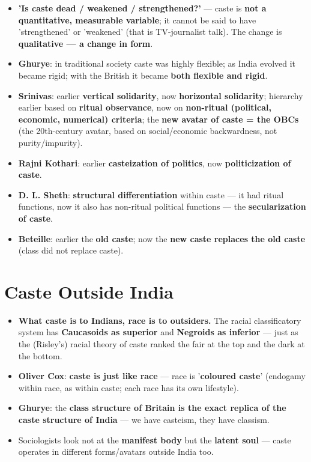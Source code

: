 \begin{KeyConcept}
\begin{itemize}
\item \textbf{'Is caste dead / weakened / strengthened?'} --- caste is \textbf{not a quantitative, measurable variable}; it cannot be said to have 'strengthened' or 'weakened' (that is TV-journalist talk). The change is \textbf{qualitative --- a change in form}.
\item \textbf{Ghurye}: in traditional society caste was highly flexible; as India evolved it became rigid; with the British it became \textbf{both flexible and rigid}.
\item \textbf{Srinivas}: earlier \textbf{vertical solidarity}, now \textbf{horizontal solidarity}; hierarchy earlier based on \textbf{ritual observance}, now on \textbf{non-ritual (political, economic, numerical) criteria}; the \textbf{new avatar of caste = the OBCs} (the 20th-century avatar, based on social/economic backwardness, not purity/impurity).
\item \textbf{Rajni Kothari}: earlier \textbf{casteization of politics}, now \textbf{politicization of caste}.
\item \textbf{D. L. Sheth}: \textbf{structural differentiation} within caste --- it had ritual functions, now it also has non-ritual political functions --- the \textbf{secularization of caste}.
\item \textbf{Beteille}: earlier the \textbf{old caste}; now the \textbf{new caste replaces the old caste} (class did not replace caste).
\end{itemize}
\end{KeyConcept}

\section{Caste Outside India}

\begin{KeyConcept}
\begin{itemize}
\item \textbf{What caste is to Indians, race is to outsiders.} The racial classificatory system has \textbf{Caucasoids as superior} and \textbf{Negroids as inferior} --- just as the (Risley's) racial theory of caste ranked the fair at the top and the dark at the bottom.
\item \textbf{Oliver Cox}: \textbf{caste is just like race} --- race is '\textbf{coloured caste}' (endogamy within race, as within caste; each race has its own lifestyle).
\item \textbf{Ghurye}: the \textbf{class structure of Britain is the exact replica of the caste structure of India} --- we have casteism, they have classism.
\item Sociologists look not at the \textbf{manifest body} but the \textbf{latent soul} --- caste operates in different forms/avatars outside India too.
\end{itemize}
\end{KeyConcept}

